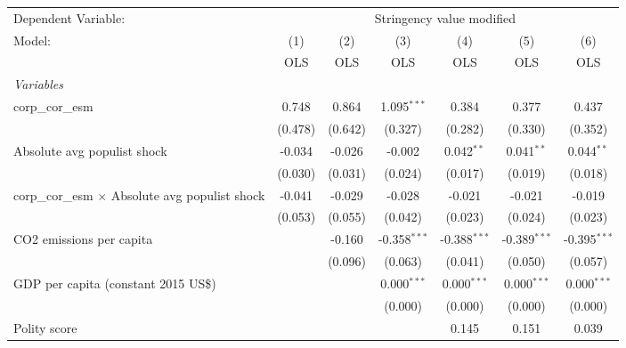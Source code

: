 
\begingroup
\centering
\begin{tabular}{lcccccc}
   \toprule
   Dependent Variable: & \multicolumn{6}{c}{Stringency value modified}\\
   Model:                                                 & (1)     & (2)     & (3)            & (4)            & (5)            & (6)\\  
                                                          &  OLS    & OLS     & OLS            & OLS            & OLS            & OLS\\  
   \midrule
   \emph{Variables}\\
   corp\_cor\_esm                                         & 0.748   & 0.864   & 1.095$^{***}$  & 0.384          & 0.377          & 0.437\\   
                                                          & (0.478) & (0.642) & (0.327)        & (0.282)        & (0.330)        & (0.352)\\   
   Absolute avg populist shock                            & -0.034  & -0.026  & -0.002         & 0.042$^{**}$   & 0.041$^{**}$   & 0.044$^{**}$\\   
                                                          & (0.030) & (0.031) & (0.024)        & (0.017)        & (0.019)        & (0.018)\\   
   corp\_cor\_esm $\times$ Absolute avg populist shock    & -0.041  & -0.029  & -0.028         & -0.021         & -0.021         & -0.019\\   
                                                          & (0.053) & (0.055) & (0.042)        & (0.023)        & (0.024)        & (0.023)\\   
   CO2 emissions per capita                               &         & -0.160  & -0.358$^{***}$ & -0.388$^{***}$ & -0.389$^{***}$ & -0.395$^{***}$\\   
                                                          &         & (0.096) & (0.063)        & (0.041)        & (0.050)        & (0.057)\\   
   GDP per capita (constant 2015 US\$)                    &         &         & 0.000$^{***}$  & 0.000$^{***}$  & 0.000$^{***}$  & 0.000$^{***}$\\   
                                                          &         &         & (0.000)        & (0.000)        & (0.000)        & (0.000)\\   
   Polity score                                           &         &         &                & 0.145          & 0.151          & 0.039\\   

\end{tabular}
